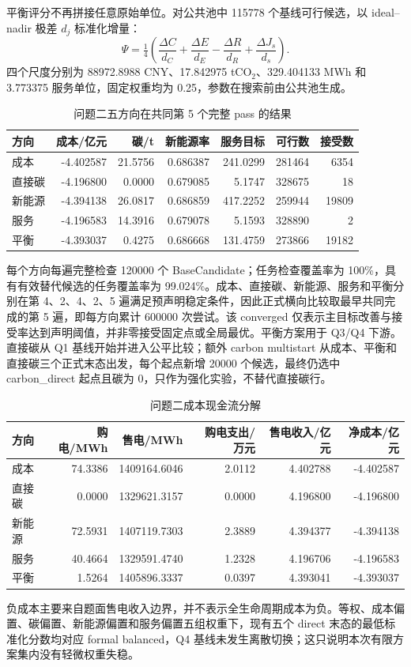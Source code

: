 平衡评分不再拼接任意原始单位。对公共池中 115778 个基线可行候选，以 ideal--nadir 极差 $d_j$ 标准化增量：
\begin{equation}
\Psi=\tfrac14\left(\frac{\Delta C}{d_C}+\frac{\Delta E}{d_E}-\frac{\Delta R}{d_R}+\frac{\Delta J_s}{d_s}\right).
\end{equation}
四个尺度分别为 88972.8988 CNY、17.842975 tCO$_2$、329.404133 MWh 和 3.773375 服务单位，固定权重均为 0.25，参数在搜索前由公共池生成。

\begin{table}[H]\centering
{\small
\caption{问题二五方向在共同第 5 个完整 pass 的结果}\label{tab:q2schemes}
\begin{tabular}{lrrrrrr}\toprule
方向 & 成本/亿元 & 碳/t & 新能源率 & 服务目标 & 可行数 & 接受数\\\midrule
成本 & -4.402587 & 21.5756 & 0.686387 & 241.0299 & 281464 & 6354\\
直接碳 & -4.196800 & 0.0000 & 0.679085 & 5.1747 & 328675 & 18\\
新能源 & -4.394138 & 26.0817 & 0.686859 & 417.2252 & 259944 & 19809\\
服务 & -4.196583 & 14.3916 & 0.679078 & 5.1593 & 328890 & 2\\
平衡 & -4.393037 & 0.4275 & 0.686668 & 131.4759 & 273866 & 19182\\\bottomrule
\end{tabular}}
\end{table}

每个方向每遍完整检查 120000 个 BaseCandidate；任务检查覆盖率为 100\%，具有有效替代候选的任务覆盖率为 99.024\%。成本、直接碳、新能源、服务和平衡分别在第 4、2、4、2、5 遍满足预声明稳定条件，因此正式横向比较取最早共同完成的第 5 遍，即每方向累计 600000 次尝试。该 converged 仅表示主目标改善与接受率达到声明阈值，并非零接受固定点或全局最优。平衡方案用于 Q3/Q4 下游。直接碳从 Q1 基线开始并进入公平比较；额外 carbon multistart 从成本、平衡和直接碳三个正式末态出发，每个起点新增 20000 个候选，最终仍选中 carbon\_direct 起点且碳为 0，只作为强化实验，不替代直接碳行。

\begin{table}[H]\centering
{\small
\caption{问题二成本现金流分解}\label{tab:q2cost}
\begin{tabular}{lrrrrr}\toprule
方向 & 购电/MWh & 售电/MWh & 购电支出/万元 & 售电收入/亿元 & 净成本/亿元\\\midrule
成本 & 74.3386 & 1409164.6046 & 2.0112 & 4.402788 & -4.402587\\
直接碳 & 0.0000 & 1329621.3157 & 0.0000 & 4.196800 & -4.196800\\
新能源 & 72.5931 & 1407119.7303 & 2.3889 & 4.394377 & -4.394138\\
服务 & 40.4664 & 1329591.4740 & 1.2328 & 4.196706 & -4.196583\\
平衡 & 1.5264 & 1405896.3337 & 0.0397 & 4.393041 & -4.393037\\\bottomrule
\end{tabular}}
\end{table}
负成本主要来自题面售电收入边界，并不表示全生命周期成本为负。等权、成本偏置、碳偏置、新能源偏置和服务偏置五组权重下，现有五个 direct 末态的最低标准化分数均对应 formal balanced，Q4 基线未发生离散切换；这只说明本次有限方案集内没有轻微权重失稳。

